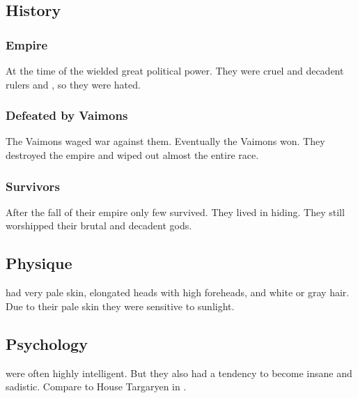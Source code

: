 \subsection{History}





\subsubsection{Empire}
At the time of  the \Saruns wielded great political power. 
They were cruel and decadent rulers and , so they were hated. 





\subsubsection{Defeated by Vaimons}
The Vaimons waged war against them. 
Eventually the Vaimons won.
They destroyed the \Sarun empire and wiped out almost the entire \Sarun race.




\subsubsection{Survivors}
After the fall of their empire only few \Saruns survived. 
They lived in hiding. 
They still worshipped their brutal and decadent gods. 









\subsection{Physique}
\Saruns had very pale skin, elongated heads with high foreheads, and white or gray hair. 
Due to their pale skin they were sensitive to sunlight.









\subsection{Psychology}
\Saruns were often highly intelligent. 
But they also had a tendency to become insane and sadistic.
Compare to House Targaryen in \cite{GeorgeRRMartin:ASongofIceandFire}. 















